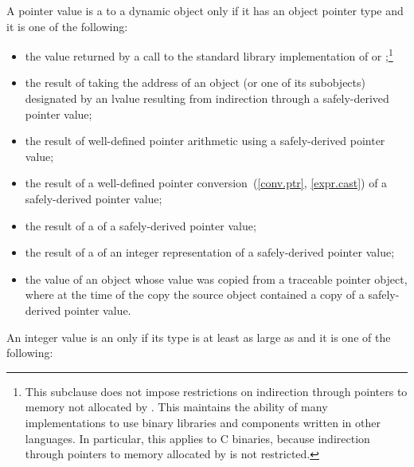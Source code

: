 \pnum
A pointer value is a  to a dynamic object only if it
has an object pointer type and it is one of the following:
\begin{itemize}
\item the value returned by a call to the \Cpp{} standard library implementation of
 or
%
;\footnote{This subclause does not impose restrictions
on indirection through pointers to memory not allocated by . This
maintains the ability of many \Cpp{} implementations to use binary libraries and
components written in other languages. In particular, this applies to C binaries,
because indirection through pointers to memory allocated by  is not restricted.}

\item the result of taking the address of an object (or one of its
  subobjects) designated by an lvalue resulting from indirection
  through a safely-derived pointer value;

\item the result of well-defined pointer arithmetic using a safely-derived pointer
value;

\item the result of a well-defined pointer
conversion~(\ref{conv.ptr}, \ref{expr.cast}) of a safely-derived pointer value;

\item the result of a  of a safely-derived pointer value;

\item the result of a  of an integer representation of a
safely-derived pointer value;

\item the value of an object whose value was copied from a traceable pointer object,
where at the time of the copy the source object contained a copy of a safely-derived
pointer value.
\end{itemize}

\pnum
{}%
%
An integer value is an 
only if its type is at least as large as  and it is one of the
following:

